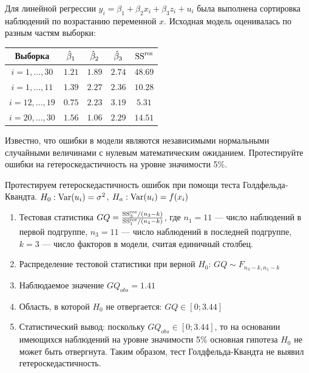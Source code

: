 \begin{problem}
Для линейной регрессии $y_i = \beta_1 + \beta_2 x_i + \beta_3 z_i + u_i$ была
выполнена сортировка наблюдений по возрастанию переменной $x$. Исходная модель оценивалась по разным частям выборки:

\begin{tabular}{c|cccc}
\toprule
Выборка & $\hat{\beta}_1$ & $\hat{\beta}_2$ & $\hat{\beta}_3$ & $\mathrm{SS}^{\text{res}}$ \\
\midrule
$i=1,\ldots, 30$ & $1.21$ & $1.89$ & $2.74$ & $48.69$ \\
$i=1,\ldots, 11$ & $1.39$ & $2.27$ & $2.36$ & $10.28$ \\
$i=12,\ldots, 19$ & $0.75$ & $2.23$ & $3.19$ & $5.31$ \\
$i=20,\ldots, 30$ & $1.56$ & $1.06$ & $2.29$ & $14.51$ \\
\bottomrule
\end{tabular}

Известно, что ошибки в модели являются независимыми нормальными случайными величинами с нулевым математическим ожиданием. Протестируйте
ошибки на гетероскедастичность на уровне значимости 5\%.



\begin{sol}
Протестируем гетероскедастичность ошибок при помощи теста Голдфельда-
Квандта. $H_0: \operatorname{Var}(u_i)=\sigma^2$, $H_a: \operatorname{Var}(u_i)=f(x_i)$

\begin{enumerate}
\item Тестовая статистика $GQ=\frac{\mathrm{SS}^{\text{res}}_3/(n_3-k)}{\mathrm{SS}^{\text{res}}_1/(n_1-k)}$, где $n_1=11$ — число наблюдений в первой подгруппе, $n_3=11$ — число наблюдений в
последней подгруппе, $k=3$ — число факторов в модели, считая единичный столбец.
\item Распределение тестовой статистики при верной $H_0$: $GQ\sim F_{n_3-k,n_1-k}$
\item Наблюдаемое значение $GQ_{obs}=1.41$
\item Область, в которой $H_0$ не отвергается: $GQ\in [0;3.44]$
\item Статистический вывод: поскольку $GQ_{obs} \in [0;3.44]$, то на основании имеющихся наблюдений на уровне значимости 5\% основная гипотеза $H_0$ не может быть отвергнута. Таким образом, тест Голдфельда-Квандта не выявил гетероскедастичность.
\end{enumerate}
\end{sol}
\end{problem}



